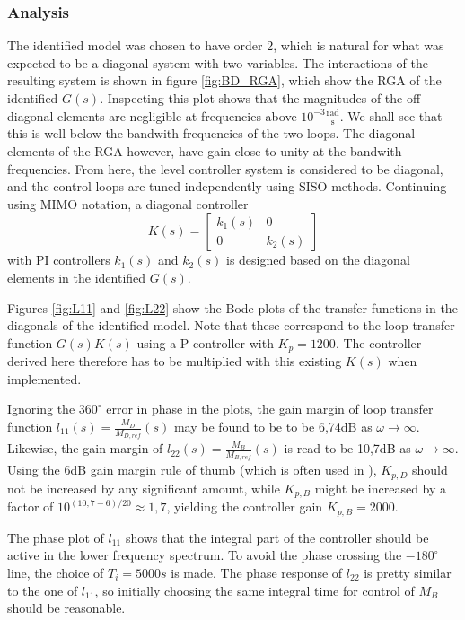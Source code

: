 \documentclass[12pt]{article}
\begin{document}
\subsubsection{Analysis}
The identified model was chosen to have order 2, which is natural for what was expected to be a diagonal system with two variables. The interactions of the resulting system is shown in figure \ref{fig:BD_RGA}, which show the RGA of the identified $G(s)$. Inspecting this plot shows that the magnitudes of the off-diagonal elements are negligible at frequencies above $10^{-3} \frac{\textrm{rad}}{\textrm{s}}$. We shall see that this is well below the bandwith frequencies of the two loops. The diagonal elements of the RGA however, have gain close to unity at the bandwith frequencies. From here, the level controller system is considered to be diagonal, and the control loops are tuned independently using SISO methods. Continuing using MIMO notation, a diagonal controller
\begin{equation}
K(s) =
\begin{bmatrix}
k_1(s) & 0\\
0 & k_2(s)
\end{bmatrix}
\end{equation}
with PI controllers $k_1(s)$ and $k_2(s)$ is designed based on the diagonal elements in the identified $G(s)$.

Figures \ref{fig:L11} and \ref{fig:L22} show the Bode plots of the transfer functions in the diagonals of the identified model. Note that these correspond to the loop transfer function $G(s) K(s)$ using a P controller with $K_p = 1200$. The controller derived here therefore has to be multiplied with this existing $K(s)$ when implemented.

Ignoring the $360^\circ$ error in phase in the plots, the gain margin of loop transfer function $l_{11}(s) = \frac{M_D}{M_{D, ref}}(s)$ may be found to be to be 6,74dB as $\omega \rightarrow \infty$. Likewise, the gain margin of $l_{22}(s) = \frac{M_B}{M_{B, ref}}(s)$ is read to be 10,7dB as $\omega \rightarrow \infty$. Using the 6dB gain margin rule of thumb (which is often used in \cite{regtek}), $K_{p, D}$ should not be increased by any significant amount, while $K_{p, B}$ might be increased by a factor of $10^{(10,7-6)/20} \approx 1,7$, yielding the controller gain $K_{p, B} = 2000$.

The phase plot of $l_{11}$ shows that the integral part of the controller should be active in the lower frequency spectrum. To avoid the phase crossing the $-180^\circ$ line, the choice of $T_i = 5000s$ is made. The phase response of $l_{22}$ is pretty similar to the one of $l_{11}$, so initially choosing the same integral time for control of $M_B$ should be reasonable.
\end{document}
